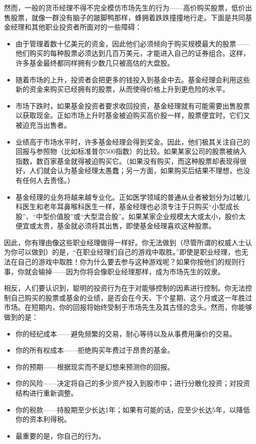 \documentclass[12pt,oneside]{book}
\begin{document}
然而，一般的货币经理不得不完全模仿市场先生的行为——高价购买股票，低价出售股票，就像一群没有脑子的跛脚鸭那样，蜂拥着跌跌撞撞地行走。下面是共同基金经理和其他职业投资者所面对的一些障碍：
\begin{itemize}
\item 由于管理着数十亿美元的资金，因此他们必须倾向于购买规模最大的股票——他们购买的每种股票必须达到几百万美元，才能进入自己的证券组合。这样，许多基金最终都同样拥有少数几只被高估的大盘股。
\item 随着市场的上升，投资者会把更多的钱投入到基金中去。基金经理会利用这些新的资金来购买已经拥有的股票，从而使得价格上升到更危险的水平。
\item 市场下跌时，如果基金投资者要求收回投资，基金经理就有可能需要出售股票以获取现金。正如市场上升时基金被迫购买高价股一样，股票便宜时，它们又被迫充当出售者。
\item 业绩高于市场水平时，许多基金经理会得到奖金。因此，他们极其关注自己的回报与参照物（比如标准普尔500指数）的比较。如果某家公司的股票被纳入指数，数百家基金就得被迫购买它。（如果没有购买，而这种股票却表现得很好，人们就会认为基金经理太愚蠢；另一方面，如果购买后结果不理想，也没有任何人去责怪。）
\item 基金经理的业务将越来越专业化。正如医学领域的普通从业者被划分为过敏儿科医生和老年耳鼻喉科医生一样，基金经理也必须专注于只购买“小型成长股”、“中型价值股”或“大型混合股”。如果某家企业规模太大或太小，股价太便宜或太贵，基金就必须将其出售，即使基金经理喜欢这种股票。
\end{itemize}

因此，你有理由像这些职业经理做得一样好。你无法做到（尽管所谓的权威人士认为你可以做到）的是，“在职业经理们自己的游戏中取胜。”即使是职业经理，也无法在自己的游戏中取胜！你为什么要去参与这种游戏呢？如果你按他们的规则行事，你就会输掉——因为你将会像职业经理那样，成为市场先生的奴隶。

相反，人们要认识到，聪明的投资行为在于对能够控制的因素进行控制。你无法控制自己购买的股票或基金的业绩，是否会在今天、下个星期、这个月或这一年胜过市场。在短期内，你的回报将始终受制于市场先生及其古怪的念头。然而，你能够做到的是：

\begin{itemize}
\item 你的经纪成本——避免频繁的交易，耐心等待以及从事费用廉价的交易。
\item 你的所有权成本——拒绝购买年费过于昂贵的基金。
\item 你的预期——根据现实而不是幻想来预测你的回报。
\item 你的风险——决定将自己的多少资产投入到股市中；进行分散化投资；对投资结构进行重新调整。
\item 你的税款——持股期至少长达1年；如果有可能的话，应至少长达5年，以降低你的资本利得税。
\item 最重要的是，你自己的行为。
\end{itemize}
\end{document}
